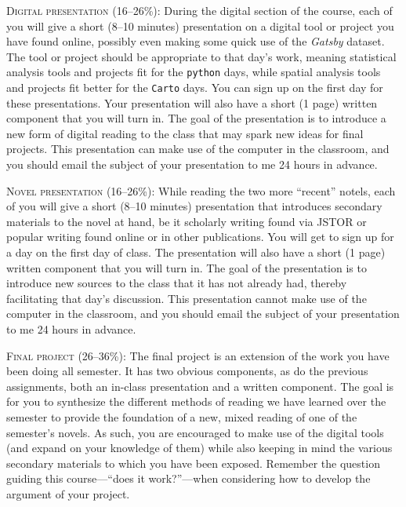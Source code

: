 \begin{description}
  \item \textsc{Digital presentation (16–26\%):} During the digital section of
    the course, each of you will give a short (8–10 minutes) presentation on a
    digital tool or project you have found online, possibly even making some
    quick use of the \textit{Gatsby} dataset. The tool or project should be
    appropriate to that day’s work, meaning statistical analysis tools and
    projects fit for the \texttt{python} days, while spatial analysis tools and
    projects fit better for the \texttt{Carto} days. You can sign up on the
    first day for these presentations. Your presentation will also have a short
    (1 page) written component that you will turn in. The goal of the
    presentation is to introduce a new form of digital reading to the class
    that may spark new ideas for final projects. This presentation can make use
    of the computer in the classroom, and you should email the subject of your
    presentation to me 24 hours in advance.

  \item \textsc{Novel presentation (16–26\%):} While reading the two more
    “recent” notels, each of you will give a short (8–10 minutes) presentation
    that introduces secondary materials to the novel at hand, be it scholarly
    writing found via JSTOR or popular writing found online or in other
    publications. You will get to sign up for a day on the first day of class.
    The presentation will also have a short (1 page) written component that you
    will turn in. The goal of the presentation is to introduce new sources to
    the class that it has not already had, thereby facilitating that day’s
    discussion. This presentation cannot make use of the computer in the
    classroom, and you should email the subject of your presentation to me 24
    hours in advance.

  \item \textsc{Final project (26–36\%):} The final project is an extension of
    the work you have been doing all semester. It has two obvious components,
    as do the previous assignments, both an in-class presentation and a written
    component. The goal is for you to synthesize the different methods of
    reading we have learned over the semester to provide the foundation of a
    new, mixed reading of one of the semester’s novels. As such, you are
    encouraged to make use of the digital tools (and expand on your knowledge
    of them) while also keeping in mind the various secondary materials to
    which you have been exposed.  Remember the question guiding this
    course—“does it work?”—when considering how to develop the argument of your
    project. 


\end{description}
